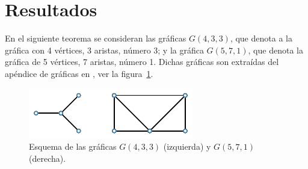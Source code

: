 \documentclass[12pt]{book}
\theoremstyle{definition}
\begin{document}
\section{Resultados}

En el siguiente teorema se consideran las gráficas $G(4,3,3)$, que denota a la gráfica con 4 vértices, 3 aristas, número 3; y la gráfica $G(5,7,1)$, que denota la gráfica de 5 vértices, 7 aristas, número 1. Dichas gráficas son extraídas del apéndice de gráficas en \cite{Harary:1969}, ver la figura~\ref{F1}.

\begin{figure}[!htbp]
	\centering
	\includegraphics[scale=1.2]{Fig0.pdf}
	\caption{Esquema de las gráficas $G(4,3,3)$ (izquierda) y $G(5,7,1)$ (derecha).\label{F1}}
\end{figure}
\end{document}
